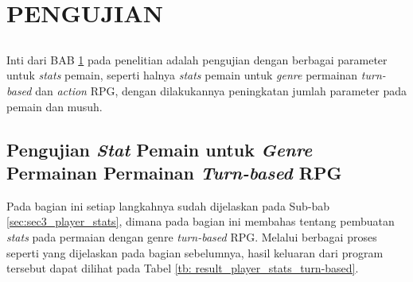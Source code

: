 \chapter{PENGUJIAN}
\label{chap:chap4_pengujian}
\vspace{1ex}

\section*{}
Inti dari BAB \ref{chap:chap4_pengujian} pada penelitian adalah pengujian dengan berbagai parameter untuk \textit{stats} pemain, seperti halnya \textit{stats} pemain untuk \textit{genre} permainan \textit{turn-based} dan \textit{action} RPG, dengan dilakukannya peningkatan jumlah parameter pada pemain dan musuh.
\vspace{1ex}

\section{Pengujian \textit{Stat} Pemain untuk \textit{Genre} Permainan Permainan \textit{Turn-based} RPG}
\label{sec:sec4_pengujian_turn-based}
\vspace{1ex}

Pada bagian ini setiap langkahnya sudah dijelaskan pada Sub-bab \ref{sec:sec3_player_stats}, dimana pada bagian ini membahas tentang pembuatan \textit{stats} pada permaian dengan genre \textit{turn-based} RPG. Melalui berbagai proses seperti yang dijelaskan pada bagian sebelumnya, hasil keluaran dari program tersebut dapat dilihat pada Tabel \ref{tb: result_player_stats_turn-based}.
\vspace{1ex}

